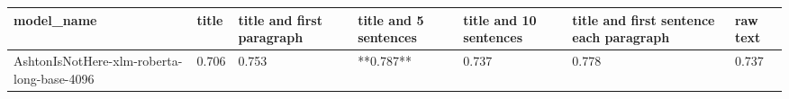 \begin{tabular}{lllllll}
\toprule
                                model\_name & title & title and first paragraph & title and 5 sentences & title and 10 sentences & title and first sentence each paragraph & raw text \\
\midrule
AshtonIsNotHere-xlm-roberta-long-base-4096 & 0.706 &                     0.753 &             **0.787** &                  0.737 &                                   0.778 &    0.737 \\
\bottomrule
\end{tabular}
